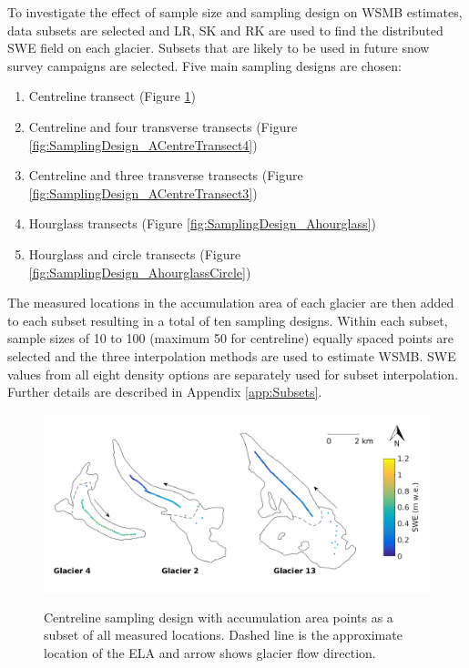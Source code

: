 \documentclass[12pt]{article}
\begin{document}
To investigate the effect of sample size and sampling design on WSMB estimates, data subsets are selected and LR, SK and RK are used to find the distributed SWE field on each glacier. Subsets that are likely to be used in future snow survey campaigns are selected. Five main sampling designs are chosen:
\begin{enumerate}
\item Centreline transect (Figure \ref{fig:SamplingDesign_Acentreline})
\item Centreline and four transverse transects (Figure \ref{fig:SamplingDesign_ACentreTransect4})
\item Centreline and three transverse transects (Figure \ref{fig:SamplingDesign_ACentreTransect3})
\item Hourglass transects (Figure \ref{fig:SamplingDesign_Ahourglass})
\item Hourglass and circle transects (Figure \ref{fig:SamplingDesign_AhourglassCircle})
\end{enumerate}
The measured locations in the accumulation area of each glacier are then added to each subset resulting in a total of ten sampling designs. Within each subset, sample sizes of 10 to 100 (maximum 50 for centreline) equally spaced points are selected and the three interpolation methods are used to estimate WSMB. SWE values from all eight density options are separately used for subset interpolation. Further details are described in Appendix \ref{app:Subsets}. 

\begin{figure}[H]
	\centering
	\includegraphics[width =\textwidth]{SamplingDesign_Acentreline.png}\\
	\caption{Centreline sampling design with accumulation area points as a subset of all measured locations. Dashed line is the approximate location of the ELA and arrow shows glacier flow direction.}
	\label{fig:SamplingDesign_Acentreline}
\end{figure}
\end{document}
